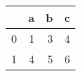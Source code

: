\begin{tabular}{lrrr}
\toprule
{} &  a &  b &  c \\
\midrule
0 &  1 &  3 &  4 \\
1 &  4 &  5 &  6 \\
\bottomrule
\end{tabular}
